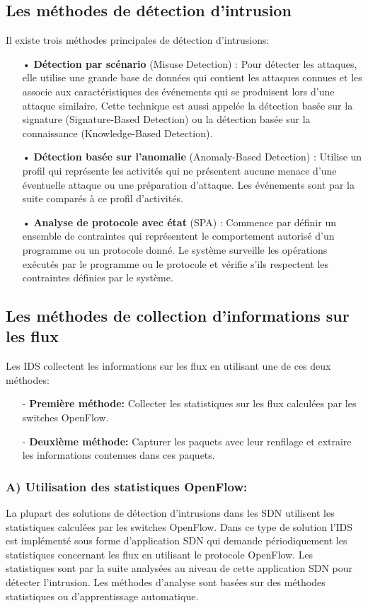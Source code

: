 \subsection{Les méthodes de détection d’intrusion} 
Il existe trois méthodes principales de détection d’intrusions:\\
\begin{itemize}
\item[•]\textbf{Détection par scénario} (Misuse Detection) : Pour détecter les attaques, elle utilise une grande base de données qui contient les attaques connues et les associe aux caractéristiques des événements qui se produisent lors d’une attaque similaire. Cette technique est aussi appelée la détection basée sur la signature (Signature-Based Detection) ou la détection basée sur la connaissance (Knowledge-Based Detection).\\
\item[•]\textbf{Détection basée sur l’anomalie} (Anomaly-Based Detection) : Utilise un profil qui représente les activités qui ne présentent aucune menace d’une éventuelle attaque ou une préparation d’attaque. Les événements sont par la suite comparés à ce profil d’activités.\\
\item[•]\textbf{Analyse de protocole avec état} (SPA) : Commence par définir un ensemble de contraintes qui représentent le comportement autorisé d’un programme ou un protocole donné. Le système surveille les opérations exécutés par le programme ou le protocole et vérifie s’ils respectent les contraintes définies par le système. 
\end{itemize} 

\subsection{Les méthodes de collection d'informations sur les flux}
Les IDS collectent les informations sur les flux en utilisant une de ces deux méthodes:\\
\begin{itemize}
\item[-] \textbf{Première méthode:} Collecter les statistiques sur les flux calculées par les switches OpenFlow.
\item[-] \textbf{Deuxième méthode:} Capturer les paquets avec leur renfilage et extraire les informations contenues dans ces paquets. 
\end{itemize}

\subsubsection{A) Utilisation des statistiques OpenFlow:}
La plupart des solutions de détection d’intrusions dans les SDN utilisent les statistiques calculées par les switches OpenFlow. Dans ce type de solution l’IDS est implémenté sous forme d’application SDN qui demande périodiquement les statistiques concernant les flux en utilisant le protocole OpenFlow. Les statistiques sont par la suite analysées au niveau de cette application SDN pour détecter l’intrusion. Les méthodes d’analyse sont basées sur des méthodes statistiques ou d’apprentissage automatique.

